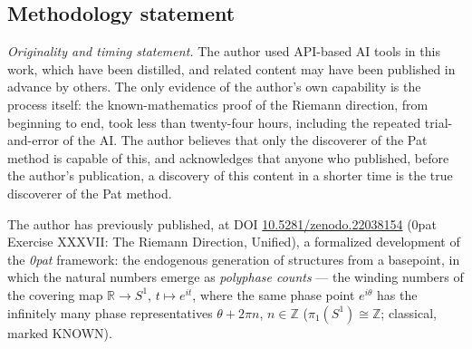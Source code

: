 \documentclass{article}
\newcommand{\R}{\mathbb{R}}
\newcommand{\Z}{\mathbb{Z}}
\begin{document}
\subsection{Methodology statement}
\label{sec:methodology}

\emph{Originality and timing statement.} The author used API-based AI
tools in this work, which have been distilled, and related content may
have been published in advance by others. The only evidence of the
author's own capability is the process itself: the known-mathematics
proof of the Riemann direction, from beginning to end, took less than
twenty-four hours, including the repeated trial-and-error of the AI.
The author believes that only the discoverer of the Pat method is
capable of this, and acknowledges that anyone who published, before the
author's publication, a discovery of this content in a shorter time is
the true discoverer of the Pat method.

The author has previously published, at DOI
\href{https://doi.org/10.5281/zenodo.22038154}{10.5281/zenodo.22038154}
(0pat Exercise XXXVII: The Riemann Direction, Unified), a formalized
development of the \emph{0pat} framework: the endogenous generation of
structures from a basepoint, in which the natural numbers emerge as
\emph{polyphase counts} --- the winding numbers of the covering map
$\R\to S^1$, $t\mapsto e^{it}$, where the same phase point $e^{i\theta}$ has
the infinitely many phase representatives $\theta+2\pi n$, $n\in\Z$
($\pi_1(S^1)\cong\Z$; classical, marked KNOWN).
\end{document}
